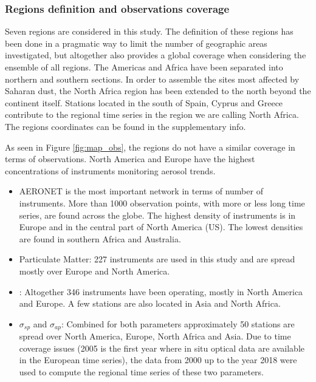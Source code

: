 \documentclass[acp, manuscript]{copernicus}
\begin{document}
\subsubsection{Regions definition and observations coverage}
Seven regions are considered in this study. The definition of these regions has been done in a pragmatic way to limit the number of geographic areas investigated, but altogether also provides a global coverage when considering the ensemble of all regions. The Americas and Africa have been separated into northern and southern sections. In order to assemble the sites most affected by Saharan dust, the North Africa region has been extended to the north beyond the continent itself. Stations located in the south of Spain, Cyprus and Greece contribute to the regional time series in the region we are calling North Africa. The regions coordinates can be found in the supplementary info.

As seen in Figure \ref{fig:map_obs}, the regions do not have a similar coverage in terms of observations. North America and Europe have the highest concentrations of instruments monitoring aerosol trends.
\begin{itemize}
 \item AERONET is the most important network in terms of number of instruments. More than 1000 observation points, with more or less long time series, are found across the globe. The highest density of instruments is in Europe and in the central part of North America (US). The lowest densities are found in southern Africa and Australia.
 \item Particulate Matter: 227 instruments are used in this study and are spread mostly over Europe and North America. 
 \item {}: Altogether 346 instruments have been operating, mostly in North America and Europe. A few stations are also located in Asia and North Africa.
 \item $\sigma_{sp}$ and $\sigma_{ap}$: Combined for both parameters approximately 50 stations are spread over North America, Europe, North Africa and Asia. Due to time coverage issues (2005 is the first year where in situ optical data are available in the European time series), the data from 2000 up to the year 2018 were used to compute the regional time series of these two parameters.
\end{itemize}
\end{document}
